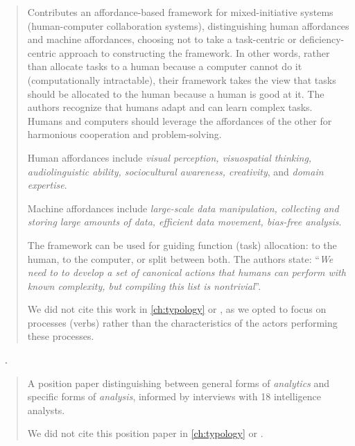 \begin{quotation}
    \begin{sloppypar}
    Contributes an affordance-based framework for mixed-initiative systems (human-computer collaboration systems), distinguishing human affordances and machine affordances, choosing not to take a task-centric or deficiency-centric approach to constructing the framework. 
    In other words, rather than allocate tasks to a human because a computer cannot do it (computationally intractable), their framework takes the view that tasks should be allocated to the human because a human is good at it. 
    The authors recognize that humans adapt and can learn complex tasks. Humans and computers should leverage the affordances of the other for harmonious cooperation and problem-solving.
    \end{sloppypar}
    
    \begin{sloppypar}
    Human affordances include {\it visual perception, visuospatial thinking, audiolinguistic ability, sociocultural awareness, creativity}, and {\it domain expertise}.
    \end{sloppypar}
    
    Machine affordances include {\it large-scale data manipulation, collecting and storing large amounts of data, efficient data movement, bias-free analysis}.
    
    The framework can be used for guiding function (\ie task) allocation: to the human, to the computer, or split between both. 
    The authors state: ``{\it We need to to develop a set of canonical actions that humans can perform with known complexity, but compiling this list is nontrivial}''.

    We did not cite this work in \autoref{ch:typology} or \citet{Brehmer2013}, as we opted to focus on processes ({\ie verbs}) rather than the characteristics of the actors performing these processes.
\end{quotation}

\begin{sloppypar}
~\cite{Mcnamara2012}. \end{sloppypar}

\begin{quotation}
    A position paper distinguishing between general forms of {\it analytics} and specific forms of {\it analysis}, informed by interviews with 18 intelligence analysts.

    We did not cite this position paper in \autoref{ch:typology} or \citet{Brehmer2013}.
\end{quotation}

